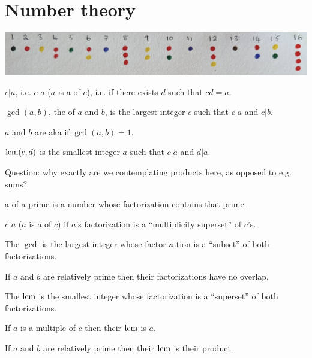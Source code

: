 \section{Number theory}


\begin{definition*}


  \begin{mdframed}
    \includegraphics[width=400pt]{img/foundations--integers-e251.png}
  \end{mdframed}

 $c | a$, i.e. $c$  $a$ ($a$ is a  of $c$), i.e. if there exists $d$ such that $cd = a$.

 $\gcd(a, b)$, the  of $a$ and $b$, is the largest integer $c$ such that $c | a$ and $c | b$.

  $a$ and $b$ are  aka  if $\gcd(a, b) = 1$.

  $\text{lcm}(c, d)$ is the smallest integer $a$ such that $c|a$ and $d|a$.
\end{definition*}

  Question: why exactly are we contemplating products here, as opposed to e.g. sums?




\begin{remark*}
  a  of a prime is a number whose factorization contains that prime.

  $c$  $a$ ($a$ is a  of $c$) if $a$'s factorization is a ``multiplicity superset​'' of $c$'s.

  The $\gcd$ is the largest integer whose factorization is a ``subset​'' of both factorizations.

  If $a$ and $b$ are relatively prime then their factorizations have no overlap.

  The $\text{lcm}$ is the smallest integer whose factorization is a ``superset​'' of both factorizations.

  If $a$ is a multiple of $c$ then their $\text{lcm}$ is $a$.

  If $a$ and $b$ are relatively prime then their $\text{lcm}$ is their product.
\end{remark*}

